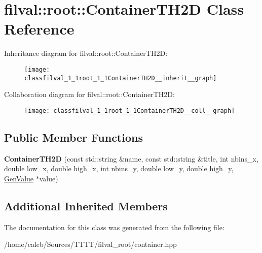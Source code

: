 \hypertarget{classfilval_1_1root_1_1ContainerTH2D}{}\section{filval\+:\+:root\+:\+:Container\+T\+H2D Class Reference}
\label{classfilval_1_1root_1_1ContainerTH2D}


Inheritance diagram for filval\+:\+:root\+:\+:Container\+T\+H2D\+:
\nopagebreak
\begin{figure}[H]
\begin{center}
\leavevmode
\texttt{[image: classfilval\_1\_1root\_1\_1ContainerTH2D\_\_inherit\_\_graph]}
\end{center}
\end{figure}


Collaboration diagram for filval\+:\+:root\+:\+:Container\+T\+H2D\+:
\nopagebreak
\begin{figure}[H]
\begin{center}
\leavevmode
\texttt{[image: classfilval\_1\_1root\_1\_1ContainerTH2D\_\_coll\_\_graph]}
\end{center}
\end{figure}
\subsection*{Public Member Functions}
\begin{DoxyCompactItemize}
\item 
\hypertarget{classfilval_1_1root_1_1ContainerTH2D_a6c06b630caedf971ef014bd55b9fefaa}{}\label{classfilval_1_1root_1_1ContainerTH2D_a6c06b630caedf971ef014bd55b9fefaa} 
{\bfseries Container\+T\+H2D} (const std\+::string \&name, const std\+::string \&title, int nbins\+\_\+x, double low\+\_\+x, double high\+\_\+x, int nbins\+\_\+y, double low\+\_\+y, double high\+\_\+y, \hyperlink{classfilval_1_1GenValue}{Gen\+Value} $\ast$value)
\end{DoxyCompactItemize}
\subsection*{Additional Inherited Members}


The documentation for this class was generated from the following file\+:\begin{DoxyCompactItemize}
\item 
/home/caleb/\+Sources/\+T\+T\+T\+T/filval\+\_\+root/container.\+hpp\end{DoxyCompactItemize}
